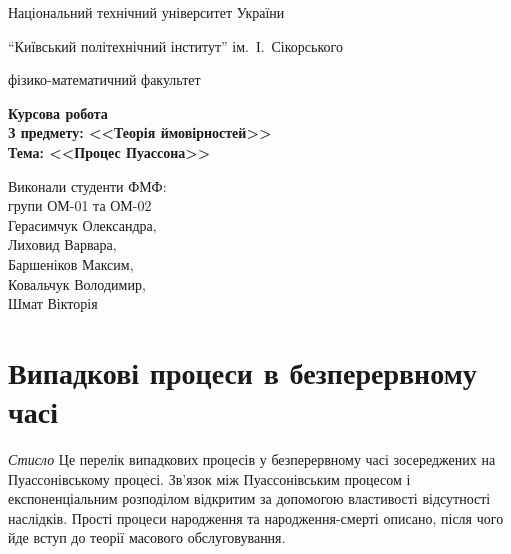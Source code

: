\documentclass[12pt,fleqn]{article}
\numberwithin{figure}{section}
\numberwithin{equation}{section}
\begin{document}
\large

\setcounter{page}{0}
\thispagestyle{empty}
\centerline{Національний технічний університет України}
\centerline{``Київський політехнічний інститут'' ім.~І.~Сікорського}
\centerline{фізико-математичний факультет}

\vspace{50mm}

\begin{center}
\Large\bf
Курсова робота\\[5mm]
З предмету: <<Теорія ймовірностей>>\\
Тема: <<Процес Пуассона>>

\end{center}

\vspace{50mm}

\begin{flushright}
\begin{minipage}{70mm}
\large Виконали студенти ФМФ:\\
групи ОМ-01 та ОМ-02\\
Герасимчук Олександра, \\
Лиховид Варвара, \\
Баршеніков Максим, \\
Ковальчук Володимир, \\
Шмат Вікторія
\end{minipage}
\end{flushright}
\newpage

\tableofcontents


\newpage

\section{Випадкові процеси в безперервному часі}\label{random processes}
\emph{Стисло} Це перелік випадкових процесів у безперервному часі зосереджених на Пуассонівському процесі. Зв'язок між Пуассонівським процесом і експоненціальним розподілом відкритим за допомогою властивості відсутності наслідків. Прості процеси народження та народження-смерті описано, після чого йде вступ до теорії масового обслуговування.
\end{document}
